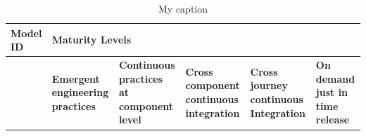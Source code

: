 \documentclass[a4paper,oneside]{bth}
\begin{document}
\begin{longtable}[h] {|l|p{2cm}|p{2cm}|p{2cm}|p{2cm}|p{2cm}|}
\caption{My caption}
\label{my-label}\\
\hline
\textbf{Model ID} & \multicolumn{5}{l|}{\textbf{Maturity Levels}}                                                                                                                                                                                                                                                                                                                                                                                                                                                                                                                                                  \\ \hline
                  & \textbf{Emergent engineering practices}                                                                                                              & \textbf{Continuous practices at component level}                                              & \textbf{Cross component continuous integration}                                                                           & \textbf{Cross journey continuous Integration}                                                                       & \textbf{On demand just in time release}                                               \\ \hline

\end{longtable}
\end{document}
